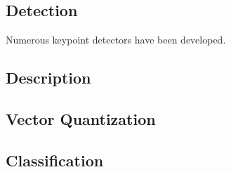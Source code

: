 \documentclass[a4paper,12pt]{article}
\begin{document}
\subsection{Detection}

	Numerous keypoint detectors have been developed. 
	
\subsection{Description}
\subsection{Vector Quantization}
\subsection{Classification}


\end{document}

